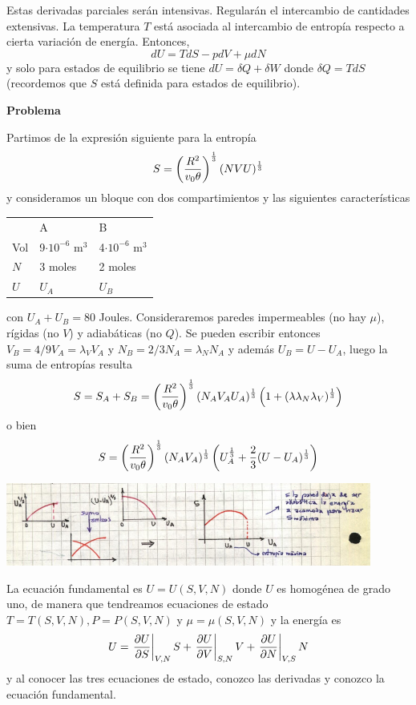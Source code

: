 \documentclass[10pt,oneside]{CBFT_book}
\begin{document}
Estas derivadas parciales serán intensivas. Regularán el intercambio de cantidades extensivas.
La temperatura $T$ está asociada al intercambio de entropía respecto a cierta variación de energía.
Entonces,
\[
	dU = TdS - p dV + \mu dN
\]
y solo para estados de equilibrio se tiene $dU = \delta Q + \delta W$ donde $\delta Q = T dS$ (recordemos
que $S$ está definida para estados de equilibrio).

\begin{ejemplo}{\bf Problema}

Partimos de la expresión siguiente para la entropía 
\[
	S = \left( \frac{ R^2 }{ v_0 \theta  } \right)^{\frac{1}{3}} (NVU)^{\frac{1}{3}}
\]
y consideramos un bloque con dos compartimientos y las siguientes características
\begin{center}
\begin{tabular}{lll}
 	& A & B \\
Vol 	& 9$\cdot 10^{-6}$ m$^3$ & 4$\cdot 10^{-6}$ m$^3$\\
$N$ 	& 3 moles & 2 moles \\
$U$ 	& $U_A$ & $U_B$
\end{tabular}
\end{center}
con $U_A+ U_B = 80$ Joules. Consideraremos paredes impermeables (no hay $\mu$), rígidas (no $V$) 
y adiabáticas (no $Q$).
Se pueden escribir entonces $V_B = 4/9 V_A =\lambda_V V_A$ y $N_B = 2/3 N_A = \lambda_N N_A$ y
además $U_B = U - U_A$, luego la suma de entropías resulta
\[
	S = S_A + S_B = \left( \frac{ R^2 }{  v_0 \theta  } \right)^{\frac 1 3 } (N_A V_A U_A)^{\frac 1 3}
	\left( 1 + ( \lambda \lambda_N \lambda_V )^{\frac 1 3} \right)
\]
o bien
\[
	S =  \left( \frac{ R^2 }{  v_0 \theta  } \right)^{\frac 1 3 } (N_A V_A )^{\frac 1 3}
	\left( U_A^{\frac 1 3} + \frac{2}{3} ( U - U_A )^{\frac 1 3} \right)
\]

\includegraphics[width=0.90\textwidth]{images/1606329021.jpg}
 
La ecuación fundamental es $U=U(S,V,N)$ donde $U$ es homogénea de grado uno, de manera que tendreamos
ecuaciones de estado $T=T(S,V,N), P=P(S,V,N)$ y $\mu=\mu(S,V,N)$ y la energía es
\[
	U = \left.\frac{\partial^{\hspace{-0.05em}} {U}}{\partial {S}^{\hspace{-0.05em}}}\right|_{V,N} S + \left.\frac{\partial^{\hspace{-0.05em}} {U}}{\partial {V}^{\hspace{-0.05em}}}\right|_{S,N} V + \left.\frac{\partial^{\hspace{-0.05em}} {U}}{\partial {N}^{\hspace{-0.05em}}}\right|_{V,S} N
\]
y al conocer las tres ecuaciones de estado, conozco las derivadas y conozco la ecuación fundamental.


\end{ejemplo}
\end{document}
